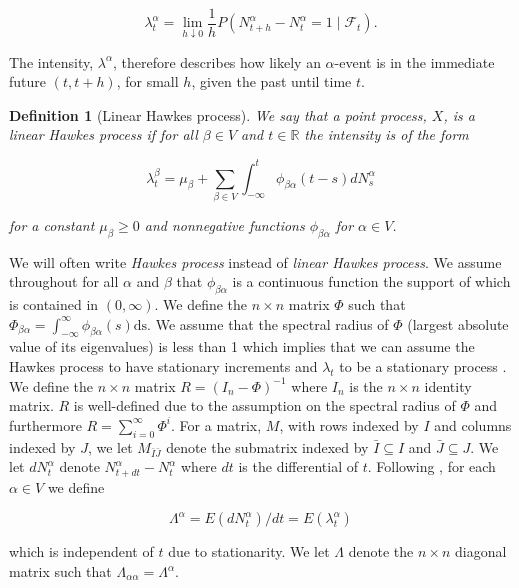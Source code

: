 \documentclass[accepted]{uai2021} %
\newtheorem{defn}[thm]{Definition}
\newcommand{\ds}{\text{ds}}
\begin{document}
$$
\lambda_t^{\alpha} = \lim_{h \downarrow 0} \dfrac{1}{h} P(N_{t + h}^\alpha  - 
N_t^\alpha = 1
\mid \mathcal{F}_t).
$$

The intensity, $\lambda^\alpha$, therefore describes how likely an 
$\alpha$-event is in the immediate future $(t, t+h)$, for small $h$, given the 
past until time $t$.

\begin{defn}[Linear Hawkes process]
	We say that a point process, $X$, is a \emph{linear Hawkes process} if for 
	all $\beta\in V$ and $t\in \mathbb{R}$ the 
	intensity is of the form
	
	$$
	\lambda_t^\beta = \mu_\beta + \sum_{\beta \in V} \int_{-\infty}^{t} 
	\phi_{\beta\alpha}(t - s) d 
	N_s^\alpha
	$$
	
	\noindent for a constant $\mu_\beta \geq 0$ and nonnegative functions 
	$\phi_{\beta\alpha}$ for $\alpha \in V$.
	\label{def:hawProc}
\end{defn}

We will often write \emph{Hawkes process} instead of \emph{linear Hawkes 
process}. 
We assume throughout for all 
$\alpha$ and $\beta$ that $\phi_{\beta\alpha}$ is a continuous 
function the support of which is contained in $(0, \infty)$. We define the 
$n\times n$ matrix $\Phi$ such that $\Phi_{\beta\alpha} = 
\int_{-\infty}^\infty 
\phi_{\beta\alpha}(s) \ds$. We assume that the spectral radius of $\Phi$ 
(largest 
absolute value of its eigenvalues) is less than 1 which implies that we can 
assume the Hawkes process to have stationary increments and $\lambda_t$ to be a 
stationary process \citep{jovanovic2015, bacry2016}.
We define the $n\times n$ matrix $R=(I_n - \Phi)^{-1}$ where $I_n$ is the 
$n\times n$ identity matrix. $R$ is well-defined due to the assumption on 
the spectral radius of $\Phi$ and furthermore $R = \sum_{i=0}^\infty \Phi^i$. 
For a matrix, $M$, with rows indexed by $I$ and columns indexed by $J$, we let 
$M_{\bar{I}\bar{J}}$ denote the submatrix indexed by $\bar{I}\subseteq I$ and 
$\bar{J}\subseteq J$. We let $dN_t^\alpha$ denote $N_{t+dt}^\alpha - 
N_t^\alpha$ where $dt$ is the 
differential of $t$. 
Following \cite{hawkesJRSSB1971}, for each $\alpha\in V$ we define

$$
\Lambda^\alpha = E(dN_t^\alpha)/dt = E(\lambda_t^\alpha)
$$

\noindent which is independent of $t$ due to stationarity. We let $\Lambda$ 
denote the $n\times n$ diagonal matrix such that $\Lambda_{\alpha\alpha} = 
\Lambda^\alpha$.
\end{document}
